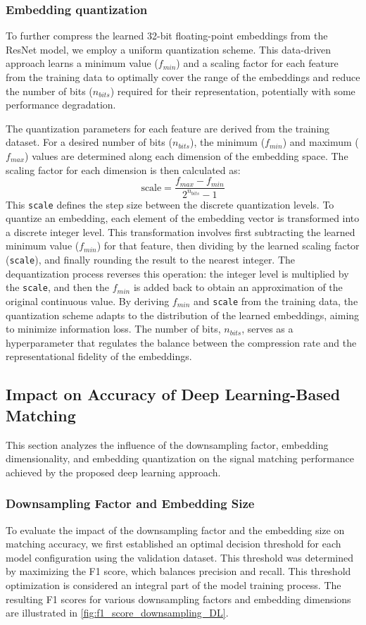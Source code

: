 \documentclass[sigconf, 10pt, nonacm, anonymous]{acmart}  %
\begin{document}
\subsubsection{Embedding quantization}
To further compress the learned 32-bit floating-point embeddings from the ResNet model, we employ a uniform quantization scheme. This data-driven approach learns a minimum value ($f_{min}$) and a scaling factor for each feature from the training data to optimally cover the range of the embeddings and reduce the number of bits ($n_{bits}$) required for their representation, potentially with some performance degradation.

The quantization parameters for each feature are derived from the training dataset. For a desired number of bits ($n_{bits}$), the minimum ($f_{min}$) and maximum ($f_{max}$) values are determined along each dimension of the embedding space. The scaling factor for each dimension is then calculated as:
\[
\text{scale} = \frac{f_{max} - f_{min}}{2^{n_{bits}} - 1}
\]
This \texttt{scale} defines the step size between the discrete quantization levels. 
To quantize an embedding, each element of the embedding vector is transformed into a discrete integer level. This transformation involves first subtracting the learned minimum value ($f_{min}$) for that feature, then dividing by the learned scaling factor (\texttt{scale}), and finally rounding the result to the nearest integer. The dequantization process reverses this operation: the integer level is multiplied by the \texttt{scale}, and then the $f_{min}$ is added back to obtain an approximation of the original continuous value. By deriving $f_{min}$ and \texttt{scale} from the training data, the quantization scheme adapts to the distribution of the learned embeddings, aiming to minimize information loss. The number of bits, $n_{bits}$, serves as a hyperparameter that regulates the balance between the compression rate and the representational fidelity of the embeddings.

\subsection{Impact on Accuracy of Deep Learning-Based Matching}
This section analyzes the influence of the downsampling factor, embedding dimensionality, and embedding quantization on the signal matching performance achieved by the proposed deep learning approach.

\subsubsection{Downsampling Factor and Embedding Size}
To evaluate the impact of the downsampling factor and the embedding size on matching accuracy, we first established an optimal decision threshold for each model configuration using the validation dataset. This threshold was determined by maximizing the F1 score, which balances precision and recall. This threshold optimization is considered an integral part of the model training process. The resulting F1 scores for various downsampling factors and embedding dimensions are illustrated in \autoref{fig:f1_score_downsampling_DL}.
\end{document}
